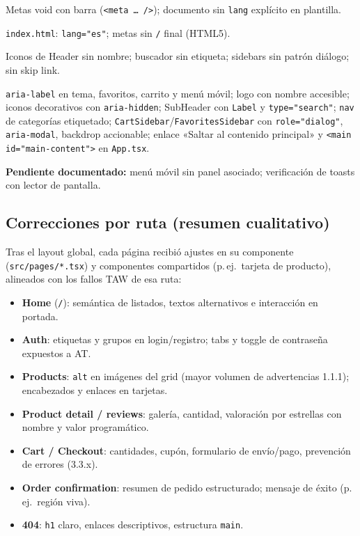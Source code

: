 \documentclass[11pt,a4paper]{article}
\begin{document}
\begin{description}[style=nextline, leftmargin=2.2cm]
  \item[Antes --- W3C] Metas void con barra (\texttt{<meta … />}); documento sin \texttt{lang} explícito en plantilla.
  \item[Después --- W3C] \texttt{index.html}: \texttt{lang="es"}; metas sin \texttt{/} final (HTML5).
  \item[Antes --- TAW] Iconos de Header sin nombre; buscador sin etiqueta; sidebars sin patrón diálogo; sin skip link.
  \item[Después --- TAW] \texttt{aria-label} en tema, favoritos, carrito y menú móvil; logo con nombre accesible; iconos decorativos con \texttt{aria-hidden}; SubHeader con \texttt{Label} y \texttt{type="search"}; \texttt{nav} de categorías etiquetado; \texttt{CartSidebar}/\texttt{FavoritesSidebar} con \texttt{role="dialog"}, \texttt{aria-modal}, backdrop accionable; enlace «Saltar al contenido principal» y \texttt{<main id="main-content">} en \texttt{App.tsx}.
\end{description}

\textbf{Pendiente documentado:} menú móvil sin panel asociado; verificación de toasts con lector de pantalla.

\subsection{Correcciones por ruta (resumen cualitativo)}

Tras el layout global, cada página recibió ajustes en su componente (\texttt{src/pages/*.tsx}) y componentes compartidos (p.\,ej.\ tarjeta de producto), alineados con los fallos TAW de esa ruta:

\begin{itemize}[noitemsep]
  \item \textbf{Home} (\texttt{/}): semántica de listados, textos alternativos e interacción en portada.
  \item \textbf{Auth}: etiquetas y grupos en login/registro; tabs y toggle de contraseña expuestos a AT.
  \item \textbf{Products}: \texttt{alt} en imágenes del grid (mayor volumen de advertencias 1.1.1); encabezados y enlaces en tarjetas.
  \item \textbf{Product detail / reviews}: galería, cantidad, valoración por estrellas con nombre y valor programático.
  \item \textbf{Cart / Checkout}: cantidades, cupón, formulario de envío/pago, prevención de errores (3.3.x).
  \item \textbf{Order confirmation}: resumen de pedido estructurado; mensaje de éxito (p.\,ej.\ región viva).
  \item \textbf{404}: \texttt{h1} claro, enlaces descriptivos, estructura \texttt{main}.
\end{itemize}
\end{document}
